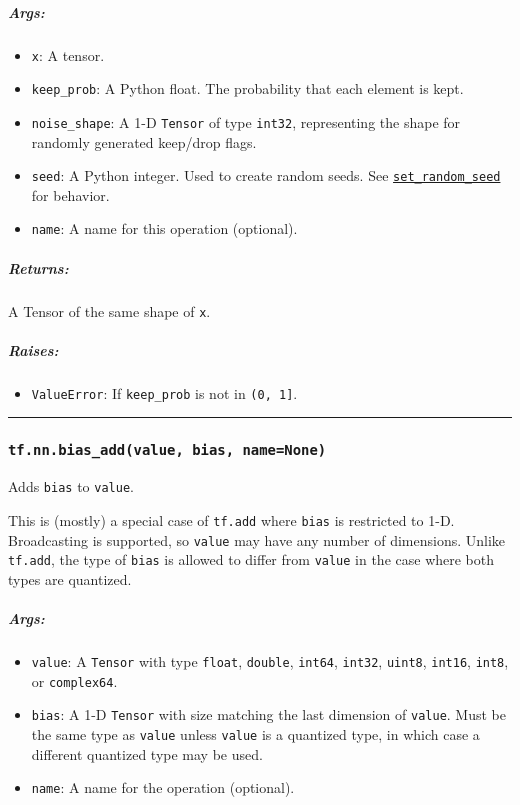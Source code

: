 \subparagraph{Args: }\label{args-3}

\begin{itemize}
\tightlist
\item
  \texttt{x}: A tensor.
\item
  \texttt{keep\_prob}: A Python float. The probability that each element
  is kept.
\item
  \texttt{noise\_shape}: A 1-D \texttt{Tensor} of type \texttt{int32},
  representing the shape for randomly generated keep/drop flags.
\item
  \texttt{seed}: A Python integer. Used to create random seeds. See
  \href{../../api_docs/python/constant_op.md\#set_random_seed}{\texttt{set\_random\_seed}}
  for behavior.
\item
  \texttt{name}: A name for this operation (optional).
\end{itemize}

\subparagraph{Returns: }\label{returns-3}

A Tensor of the same shape of \texttt{x}.

\subparagraph{Raises: }\label{raises}

\begin{itemize}
\tightlist
\item
  \texttt{ValueError}: If \texttt{keep\_prob} is not in
  \texttt{(0,\ 1{]}}.
\end{itemize}

\begin{center}\rule{0.5\linewidth}{\linethickness}\end{center}

\subsubsection{\texorpdfstring{\texttt{tf.nn.bias\_add(value,\ bias,\ name=None)}
}{tf.nn.bias\_add(value, bias, name=None) }}\label{tf.nn.biasux5faddvalue-bias-namenone}

Adds \texttt{bias} to \texttt{value}.

This is (mostly) a special case of \texttt{tf.add} where \texttt{bias}
is restricted to 1-D. Broadcasting is supported, so \texttt{value} may
have any number of dimensions. Unlike \texttt{tf.add}, the type of
\texttt{bias} is allowed to differ from \texttt{value} in the case where
both types are quantized.

\subparagraph{Args: }\label{args-4}

\begin{itemize}
\tightlist
\item
  \texttt{value}: A \texttt{Tensor} with type \texttt{float},
  \texttt{double}, \texttt{int64}, \texttt{int32}, \texttt{uint8},
  \texttt{int16}, \texttt{int8}, or \texttt{complex64}.
\item
  \texttt{bias}: A 1-D \texttt{Tensor} with size matching the last
  dimension of \texttt{value}. Must be the same type as \texttt{value}
  unless \texttt{value} is a quantized type, in which case a different
  quantized type may be used.
\item
  \texttt{name}: A name for the operation (optional).
\end{itemize}

